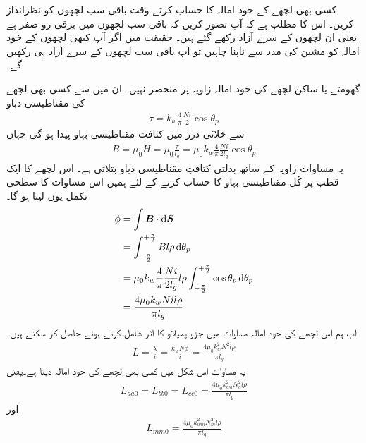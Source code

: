 کسی بھی لچھے کے خود امالہ کا حساب کرتے وقت باقی سب لچھوں کو نظرانداز کریں۔ اس کا مطلب ہے کہ آپ تصور کریں کہ باقی سب لچھوں میں برقی رو صفر ہے یعنی ان لچھوں  کے سرے آزاد رکھے گئے ہیں۔ حقیقت میں اگر آپ کبھی لچھوں کے خود امالہ کو مشین کی مدد سے ناپنا چاہیں تو آپ باقی سب لچھوں کے سرے آزاد ہی رکھیں گے۔ 

گھومتے یا ساکن لچھے کی خود امالہ  زاویہ  پر منحصر نہیں۔ ان میں سے کسی بھی لچھے کی مقناطیسی دباو  
\begin{align}
\tau=k_w \frac{4}{\pi}\frac{N i}{2} \cos \theta_p
\end{align}
سے خلائی درز میں کثافت مقناطیسی بہاو   پیدا ہو گی جہاں	
\begin{align}
B=\mu_0 H=\mu_0 \frac{\tau}{l_g}=\mu_0 k_w \frac{4}{\pi}\frac{N i}{2 l_g} \cos \theta_p
\end{align}
یہ مساوات زاویہ  کے ساتھ بدلتی کثافتِ مقناطیسی دباو  بتلاتی ہے۔ اس لچھے کا ایک قطب پر  کُل مقناطیسی بہاو  کا حساب کرنے کے لئے ہمیں اس مساوات کا سطحی تکمل یوں لینا ہو گا۔
\begin{gather}
\begin{aligned}\label{مساوات_معاصر_بہاو_بذریع_سطحی_تکمل}
\phi&=\int \kvec{B} \cdot \dif \kvec{S}\\
&=\int_{-\frac{\pi}{2}}^{+\frac{\pi}{2}} B l \rho \dif \theta_p\\
&=\mu_0 k_w \frac{4}{\pi}\frac{N i}{2 l_g} l \rho \int_{-\frac{\pi}{2}}^{+\frac{\pi}{2}}  \cos  \theta_p \dif \theta_p\\
&=\frac{4 \mu_0 k_w N i l \rho}{\pi l_g}
\end{aligned}
\end{gather}
اب ہم اس لچھے کی خود امالہ  مساوات  میں جزو پھیلاو  کا اثر شامل کرتے ہوئے  حاصل کر سکتے ہیں۔
\begin{align}
L=\frac{\lambda}{i}=\frac{k_w N \phi}{i}=\frac{4 \mu_0 k_w^2 N^2  l \rho}{\pi l_g}
\end{align}
یہ مساوات اس شکل میں کسی بھی لچھے کی خود امالہ دیتا ہے۔یعنی
\begin{align}\label{مساوات_معاصر_تین_ساکن_امالہ_برابر}
L_{aa0}=L_{bb0}=L_{cc0}=\frac{4 \mu_0 k_{wa}^2 N_a^2  l \rho}{\pi l_g}
\end{align}
اور
\begin{align}
L_{mm0}=\frac{4 \mu_0 k_{wm}^2 N_m^2  l \rho}{\pi l_g}
\end{align}
